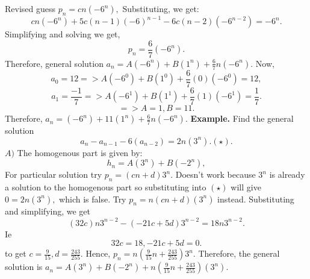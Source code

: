 \documentclass{article}
\begin{document}
\newline
\newline  
Revised guess $p_n = cn(-6^n),$
\newline
Substituting, we get:
$$cn(-6^n) + 5c(n - 1)(-6)^{n - 1} - 6c(n - 2)(-6^{n - 2}) = -6^n.$$
Simplifying and solving we get,
$$p_n = \frac{6}{7} (-6^n).$$
Therefore, general solution $a_n = A(-6^n) + B(1^n) + \frac{6}{7}n(-6^n).$
\newline
Now,
$$a_0 = 12 => A(-6^0) + B(1^0) + \frac{6}{7}(0)(-6^0) = 12,$$
$$a_1 = \frac{-1}{7} => A(-6^1) + B(1^1) + \frac{6}{7}(1)(-6^1) = \frac{1}{7}.$$
$$=> A = 1, B = 11.$$
Therefore, $a_n = (-6^n) + 11(1^n) + \frac{6}{7}n(-6^n).$
\newline
\newline
\textbf{Example. } Find the general solution 
$$a_n - a_{n - 1} - 6(a_{n - 2}) = 2n(3^n). (\star).$$
$A) $ The homogenous part is given by:
$$h_n = A(3^n) + B(-2^n),$$
For particular solution try $p_n = (cn + d) 3^n.$
\newline
\newline
Doesn't work because $3^n$ is already a solution to the homogenous part so 
substituting into $(\star)$ will give $0 = 2n(3^n),$ which is false.
\newline
\newline
Try $p_n = n(cn + d)(3^n)$ instead. Substituting and simplifying, we get 
$$(32c)n3^{n - 2} - (-21c + 5d)3^{n - 2} = 18n3^{n - 2}.$$
Ie
$$32c = 18, -21c + 5d = 0.$$
to get $c = \frac{9}{15}, d = \frac{243}{255}.$
\newline
\newline
Hence, $p_n = n(\frac{9}{15}n + \frac{243}{255})3^n.$
\newline
Therefore, the general solution is $a_n = A(3^n) + B(-2^n) + n(\frac{9}{15}n + \frac{243}{255})(3^n).$
\newpage
\end{document}
